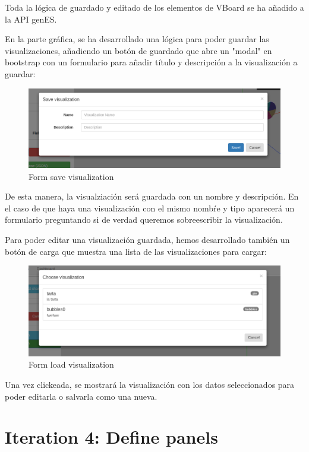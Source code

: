 \documentclass[a4paper, 12pt]{book}
\begin{document}
Toda la lógica de guardado y editado de los elementos de VBoard se ha añadido a la API genES.

En la parte gráfica, se ha desarrollado una lógica para poder guardar las visualizaciones, añadiendo un botón de guardado que abre un "modal" en bootstrap con un formulario para añadir título y descripción a la visualización a guardar:

\begin{figure}[H]
  \centering
  \includegraphics[width=16cm, keepaspectratio]{img/development/examplesave}
  \caption{Form save visualization}
  \label{fig:examplesave}
\end{figure}

De esta manera, la visualziación será guardada con un nombre y descripción. En el caso de que haya una visualización con el mismo nombŕe y tipo aparecerá un formulario preguntando si de verdad queremos sobreescribir la visualización.

Para poder editar una visualización guardada, hemos desarrollado también un botón de carga que muestra una lista de las visualizaciones para cargar:

\begin{figure}[H]
  \centering
  \includegraphics[width=16cm, keepaspectratio]{img/development/exampleload}
  \caption{Form load visualization}
  \label{fig:exampleload}
\end{figure}

Una vez clickeada, se mostrará la visualización con los datos seleccionados para poder editarla o salvarla como una nueva.

\section{Iteration 4: Define panels}
\end{document}
